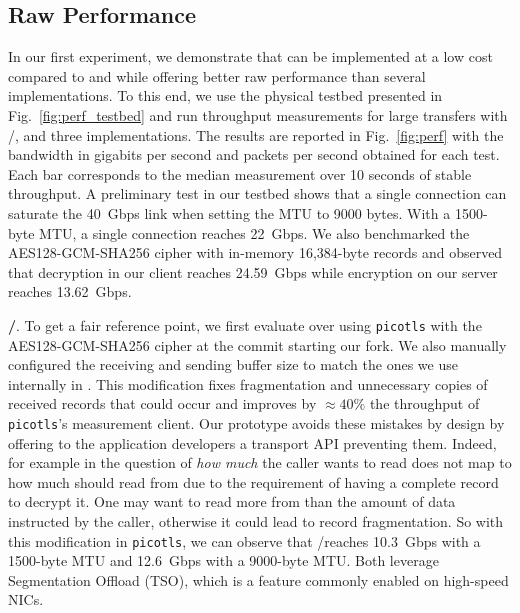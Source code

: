 


\subsection{Raw Performance} \label{sec:perf}
In our first experiment, we demonstrate that \tcpls can be implemented at a low
cost compared to \tcp and \tls while offering better raw performance than
several \quic implementations. To this end, we use the physical testbed
presented in Fig.~\ref{fig:perf_testbed} and run throughput measurements for
large transfers with \tcp/\tls, \tcpls and three \quic implementations.
The results are reported in Fig.~\ref{fig:perf} with the bandwidth
in gigabits per second and packets per second obtained for each test.
Each bar corresponds to the median measurement over 10 seconds of stable
throughput. A preliminary test in our testbed shows that a single \tcp
connection can saturate the 40~Gbps link when setting the MTU to 9000 bytes.
With a 1500-byte MTU, a single \tcp connection reaches 22~Gbps. We also
benchmarked the AES128-GCM-SHA256 cipher with in-memory 16,384-byte \tls
records and observed that decryption in our client reaches 24.59~Gbps while
encryption on our server reaches 13.62~Gbps.


\textbf{\tcp/\tls}. To get a fair reference point, we first evaluate \tls over
\tcp using \texttt{picotls} with the AES128-GCM-SHA256 cipher at the commit
starting our fork. We also manually configured the receiving and sending buffer
size to match the ones we use internally in \tcpls. This modification fixes
fragmentation and unnecessary copies of received \tls records that could occur
and improves by $\approx 40\%$ the throughput of \texttt{picotls}'s measurement
client. Our \tcpls prototype avoids these mistakes by design by offering to the
application developers a transport API preventing them. Indeed, for example in
\tcpls the question of \textit{how much} the caller wants to read does not map
to how much \tcpls should read from \tcp due to the requirement of having a
complete record to decrypt it. One may want to read more
from \tcp than the amount of data instructed by the caller, otherwise it could
lead to record fragmentation. %
So with this modification in \texttt{picotls}, we can observe that \tcp/\tls reaches
10.3~Gbps with a 1500-byte MTU and 12.6~Gbps with a 9000-byte MTU. Both
leverage \tcp Segmentation Offload (TSO), which is a
feature commonly enabled on high-speed NICs.

